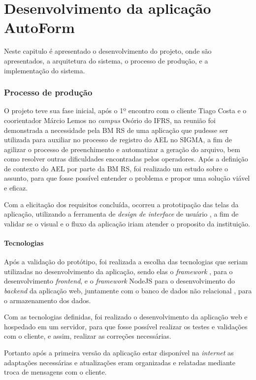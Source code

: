 \chapter{Desenvolvimento da aplicação AutoForm}
Neste capitulo é apresentado o desenvolvimento do projeto, onde são apresentados, a arquitetura do sistema, o processo de produção, e a implementação do sistema.

\subsection{Processo de produção}
O projeto teve sua fase inicial, após o 1º encontro com o cliente Tiago Costa e o coorientador Márcio Lemos no \textit{campus} Osório do IFRS, na reunião foi demonstrada a necessidade pela BM RS de uma aplicação que pudesse ser utilizada para auxiliar no processo de registro do AEL no SIGMA, a fim de agilizar o processo de preenchimento e automatizar a geração do arquivo, bem como resolver outras dificuldades encontradas pelos operadores.
Após a definição de contexto do AEL por parte da BM RS, foi realizado um estudo sobre o assunto, para que fosse possível entender o problema e propor uma solução viável e eficaz. 

Com a elicitação dos requisitos concluída, ocorreu a prototipação das telas da aplicação, utilizando a ferramenta de \textit{design de interface } de usuário , a fim de validar se o visual e o fluxo da aplicação iriam atender o proposito da instituição.

\subsubsection{Tecnologias}\label{sec:tecnologias}
Após a validação do protótipo, foi realizada a escolha das tecnologias que seriam utilizadas no desenvolvimento da aplicação, sendo elas o \textit{framework} , para o desenvolvimento \textit{frontend}, e o \textit{framework} NodeJS  para o desenvolvimento do \textit{backend} da aplicação web, juntamente com o banco de dados não relacional , para o armazenamento dos dados.

Com as tecnologias definidas, foi realizado o desenvolvimento da aplicação web e hospedado em um servidor, para que fosse possível realizar os testes e validações com o cliente, e assim, realizar as correções necessárias. 

Portanto após a primeira versão da aplicação estar disponível na \textit{internet} as adaptações necessárias e atualizações eram organizadas e relatadas mediante troca de mensagens com o cliente.

